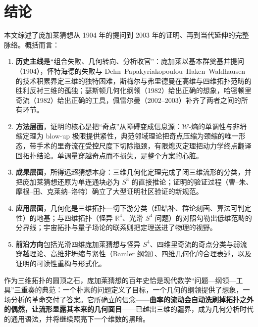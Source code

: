 \section{结论}\label{sec:conclusion}

本文综述了庞加莱猜想从 1904 年的提问到 2003 年的证明、再到当代延伸的完整脉络。概括而言：

\begin{enumerate}[label=(\arabic*)]
    \item \textbf{历史主线}是“组合失败、几何转向、分析收官”：庞加莱以基本群奠基并提问（1904），怀特海德的失败与 Dehn--Papakyriakopoulou--Haken--Waldhausen 的技术积累界定三维的独特困难，斯梅尔与弗里德曼在高维与四维拓扑范畴的胜利反衬三维的孤独；瑟斯顿几何化纲领（1982）给出正确的想象，哈密顿里奇流（1982）给出正确的工具，佩雷尔曼（2002--2003）补齐了两者之间的所有环节。
    \item \textbf{方法层面}，证明的核心是把“奇点”从障碍变成信息源：$\mathcal{W}$-熵的单调性与非坍缩定理为 blow-up 极限提供紧性，典范邻域理论把奇点压缩为颈缩的唯一形态，带手术的里奇流在受控尺度下切除瓶颈，有限熄灭定理把动力学终点翻译回拓扑结论。单调量穿越奇点而不损失，是整个方案的心脏。
    \item \textbf{成果层面}，所得远超猜想本身：三维几何化定理完成了闭三维流形的分类，并把庞加莱猜想还原为单连通块必为 $S^3$ 的直接推论；证明的验证过程（曹--朱、摩根--田、克莱纳--洛特）确立了大型证明社区验证的新规范。
    \item \textbf{应用层面}，几何化是三维拓扑一切下游分类（纽结补、群论刻画、算法可判定性）的地基；与四维拓扑（怪异 $\mathbb{R}^4$、光滑 $S^4$ 问题）的对照勾勒出低维范畴的分界线；宇宙拓扑与量子场论的联系则把定理送进了物理的视野。
    \item \textbf{前沿方向}包括光滑四维庞加莱猜想与怪异 $S^4$、四维里奇流的奇点分类与弱流穿越理论、高维非坍缩与紧性（Bamler 纲领）、四维几何化的合理表述，以及证明的可读性重构与形式化。
\end{enumerate}

作为三维拓扑的圆顶之石，庞加莱猜想的百年史恰是现代数学“问题—纲领—工具”三重奏的典范：一个朴素的问题定义了目标，一个几何的纲领提供了想象，一场分析的革命交付了答案。它所确立的信念——\textbf{曲率的流动会自动洗刷掉拓扑之外的偶然，让流形显露其本来的几何面目}——已越出三维的疆界，成为几何分析时代的通用语法，并将继续照亮下一个维数的黑暗。
